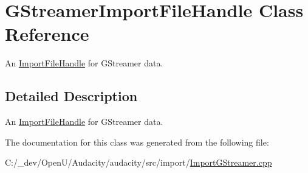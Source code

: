 \hypertarget{class_g_streamer_import_file_handle}{}\section{G\+Streamer\+Import\+File\+Handle Class Reference}
\label{class_g_streamer_import_file_handle}


An \hyperlink{class_import_file_handle}{Import\+File\+Handle} for G\+Streamer data.  




\subsection{Detailed Description}
An \hyperlink{class_import_file_handle}{Import\+File\+Handle} for G\+Streamer data. 

The documentation for this class was generated from the following file\+:\begin{DoxyCompactItemize}
\item 
C\+:/\+\_\+dev/\+Open\+U/\+Audacity/audacity/src/import/\hyperlink{_import_g_streamer_8cpp}{Import\+G\+Streamer.\+cpp}\end{DoxyCompactItemize}
